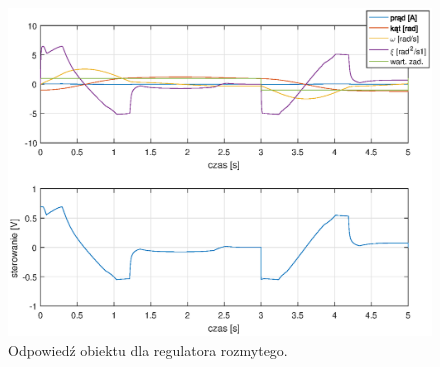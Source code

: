 \begin{figure}[h!]
	\centering
	\includegraphics[scale = 0.75]{fig/fuzzy_odp.eps}
	\caption		
	{Odpowied\'z obiektu dla regulatora rozmytego.}
	\label{fuzzyOdp}
\end{figure}


